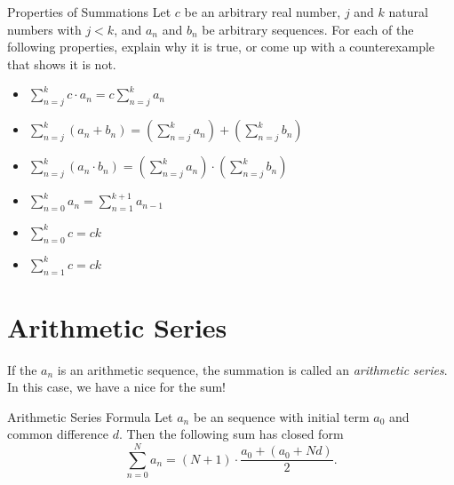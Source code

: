 \begin{exercise}{Properties of Summations \Coffeecup \Coffeecup \Coffeecup }
Let $c$ be an arbitrary real number, $j$ and $k$ natural numbers with $j<k$, and $a_n$ and $b_n$ be arbitrary sequences.  For each of the following properties, explain why it is true, or come up with a counterexample that shows it is not.
\begin{itemize}
\item $\sum\limits_{n=j}^{k} c\cdot a_n=c\sum\limits_{n=j}^{k} a_n $
\vspace*{.5in}
\item $\sum\limits_{n=j}^{k} \left( a_n+b_n\right) =\left(\sum\limits_{n=j}^{k}  a_n\right) +\left( \sum\limits_{n=j}^{k} b_n\right)$
\vspace*{.4in}
\item $\sum\limits_{n=j}^{k} \left( a_n\cdot b_n\right) =\left(\sum\limits_{n=j}^{k}  a_n\right) \cdot\left( \sum\limits_{n=j}^{k} b_n\right) $
\vspace*{.4in}
\item  $\sum\limits_{n=0}^{k}  a_n =\sum\limits_{n=1}^{k+1}  a_{n-1}$
\vspace*{.4in}
\item  $\sum\limits_{n=0}^{k}  c =ck$
\vspace*{.4in}
\item  $\sum\limits_{n=1}^{k}  c =ck$
\vspace*{.4in}
\end{itemize}
\end{exercise}

\section{Arithmetic Series} If the  $a_n$ is an arithmetic sequence, the summation is called an \emph{arithmetic series}.  In this case, we have a nice  for the sum!  

\begin{theorem}{Arithmetic Series Formula}  Let $a_n$ be an  sequence with initial term $a_0$ and common difference $d$.  Then the following sum has closed form $$\sum_{n=0}^N a_n = \left(N+1\right)\cdot\frac{a_0+\left(a_0+Nd\right)}{2}. $$
\end{theorem}

